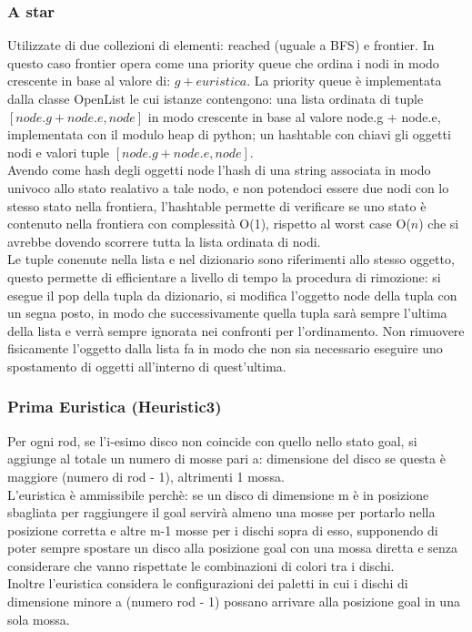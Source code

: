 \documentclass{article}
\begin{document}
\subsubsection*{A star}
Utilizzate di due collezioni di elementi: reached (uguale a BFS) e frontier. In questo caso frontier opera come una priority queue che ordina i nodi in modo crescente in base al valore di: $g + euristica$.
La priority queue è implementata dalla classe OpenList le cui istanze contengono: una lista ordinata di tuple $[node.g + node.e , node]$ in modo crescente in base al valore node.g + node.e, 
implementata con il modulo heap di python; un hashtable con chiavi gli oggetti nodi e valori tuple $[node.g + node.e , node]$.\\
Avendo come hash degli oggetti node l'hash di una string associata in modo univoco allo stato realativo a tale nodo, e non potendoci essere due nodi con lo stesso stato nella
frontiera, l'hashtable permette di verificare se uno stato è contenuto nella frontiera con complessità O(1), rispetto al worst case O($n$) che si avrebbe
dovendo scorrere tutta la lista ordinata di nodi.\\
Le tuple conenute nella lista e nel dizionario sono riferimenti allo stesso oggetto, questo permette di efficientare a livello di tempo la procedura di rimozione: si esegue il
pop della tupla da dizionario, si modifica l'oggetto node della tupla con un segna posto, in modo che successivamente quella tupla sarà sempre l'ultima della lista e verrà sempre ignorata nei confronti per l'ordinamento. Non rimuovere fisicamente l'oggetto dalla lista fa in modo che non sia necessario eseguire uno spostamento di oggetti all'interno di quest'ultima.

\subsubsection*{Prima Euristica (Heuristic3)}
Per ogni rod, se l'i-esimo disco non coincide con quello nello stato goal, si aggiunge al totale un numero di mosse pari a: dimensione del disco se questa è maggiore (numero di rod - 1), altrimenti 1 mossa.\\
L'euristica è ammissibile perchè: se un disco di dimensione m è in posizione sbagliata per raggiungere il goal servirà almeno una mosse per portarlo nella posizione
corretta e altre m-1 mosse per i dischi sopra di esso, supponendo di poter sempre spostare un disco alla posizione goal con una mossa diretta e senza considerare che vanno
rispettate le combinazioni di colori tra i dischi.
\\ Inoltre l'euristica considera le configurazioni dei paletti in cui i dischi di dimensione minore a (numero rod - 1) possano arrivare alla posizione goal in una sola mossa.
\end{document}
